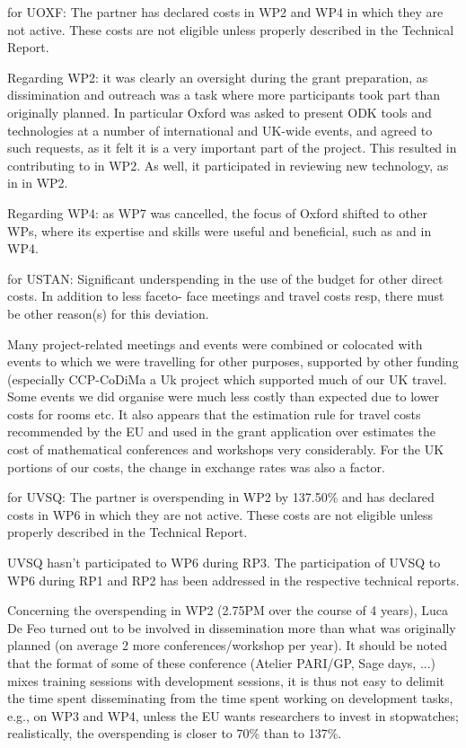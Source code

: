 for UOXF:
The partner has declared costs in WP2 and WP4 in which they are not active. These costs are
not eligible unless properly described in the Technical Report.

Regarding WP2: it was clearly an oversight during the grant preparation, as dissimination and outreach was a task where more participants took part than originally planned. In particular Oxford was asked to present ODK tools and technologies at a number of international and UK-wide events,
and agreed to such requests, as it felt it is a very important part of the project. This resulted in contributing to  in WP2. As well, it participated in reviewing new technology, as in  in WP2.

Regarding WP4: as WP7 was cancelled, the focus of Oxford shifted to other WPs, where its expertise and skills were useful and beneficial, such as  and  in WP4.


for USTAN:
Significant underspending in the use of the budget for other direct costs. In addition to less faceto-
face meetings and travel costs resp, there must be other reason(s) for
this deviation.

Many project-related meetings and events were combined or colocated
with events to which we were travelling for other purposes, supported
by other funding (especially CCP-CoDiMa a Uk project which supported
much of our UK travel. Some events we did organise were much less
costly than expected due to lower costs for rooms etc. It also appears
that the  estimation rule for travel costs recommended by the EU and
used in the grant application over estimates the cost of mathematical
conferences and workshops very considerably. For the UK portions of
our costs, the change in exchange rates was also a factor.




for UVSQ:
The partner is overspending in WP2 by 137.50\% and has declared costs in WP6 in which they
are not active. These costs are not eligible unless properly described in the Technical Report.

UVSQ hasn't participated to WP6 during RP3. The participation of UVSQ
to WP6 during RP1 and RP2 has been addressed in the respective technical reports.

Concerning the overspending in WP2 (2.75PM over the course of 4
years), Luca De Feo turned out to be involved in dissemination more
than what was originally planned (on average 2 more
conferences/workshop per year). It should be noted that the format of
some of these conference (Atelier PARI/GP, Sage days, ...) mixes
training sessions with development sessions, it is thus not easy to
delimit the time spent disseminating from the time spent working on
development tasks, e.g., on WP3 and WP4, unless the EU wants
researchers to invest in stopwatches; realistically, the overspending
is closer to 70\% than to 137\%.

